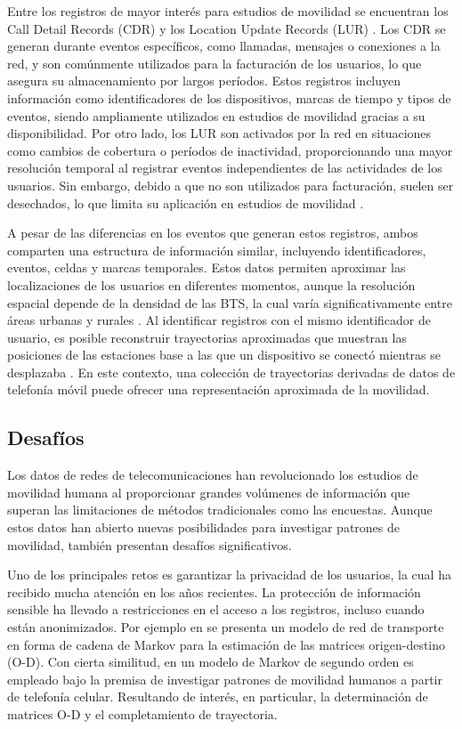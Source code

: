 Entre los registros de mayor interés para estudios de movilidad se encuentran los Call Detail Records (CDR) y los Location Update Records (LUR) \cite{gutierrez2020como}. Los CDR se generan durante eventos específicos, como llamadas, mensajes o conexiones a la red, y son comúnmente utilizados para la facturación de los usuarios, lo que asegura su almacenamiento por largos períodos. Estos registros incluyen información como identificadores de los dispositivos, marcas de tiempo y tipos de eventos, siendo ampliamente utilizados en estudios de movilidad gracias a su disponibilidad. Por otro lado, los LUR son activados por la red en situaciones como cambios de cobertura o períodos de inactividad, proporcionando una mayor resolución temporal al registrar eventos independientes de las actividades de los usuarios. Sin embargo, debido a que no son utilizados para facturación, suelen ser desechados, lo que limita su aplicación en estudios de movilidad \cite{durive2021sistema}.

A pesar de las diferencias en los eventos que generan estos registros, ambos comparten una estructura de información similar, incluyendo identificadores, eventos, celdas y marcas temporales. Estos datos permiten aproximar las localizaciones de los usuarios en diferentes momentos, aunque la resolución espacial depende de la densidad de las BTS, la cual varía significativamente entre áreas urbanas y rurales \cite{forghani2020cellular}. Al identificar registros con el mismo identificador de usuario, es posible reconstruir trayectorias aproximadas que muestran las posiciones de las estaciones base a las que un dispositivo se conectó mientras se desplazaba \cite{chen2018individual}. En este contexto, una colección de trayectorias derivadas de datos de telefonía móvil puede ofrecer una representación aproximada de la movilidad.

\subsection*{Desafíos}

Los datos de redes de telecomunicaciones han revolucionado los estudios de movilidad humana al proporcionar grandes volúmenes de información que superan las limitaciones de métodos tradicionales como las encuestas. Aunque estos datos han abierto nuevas posibilidades para investigar patrones de movilidad, también presentan desafíos significativos.

Uno de los principales retos es garantizar la privacidad de los usuarios, la cual ha recibido mucha atención en los años recientes. La protección de información sensible ha llevado a restricciones en el acceso a los registros, incluso cuando están anonimizados. Por ejemplo en \cite{tesselkin2017estimation} se presenta un modelo de red de transporte en forma de cadena de Markov para la estimación de las matrices origen-destino (O-D). Con cierta similitud, en \cite{pourmoradnasseri2019od} un modelo de Markov de segundo orden es empleado bajo la premisa de investigar patrones de movilidad humanos a partir de telefonía celular. Resultando de interés, en particular, la determinación de matrices O-D y el completamiento de trayectoria.

